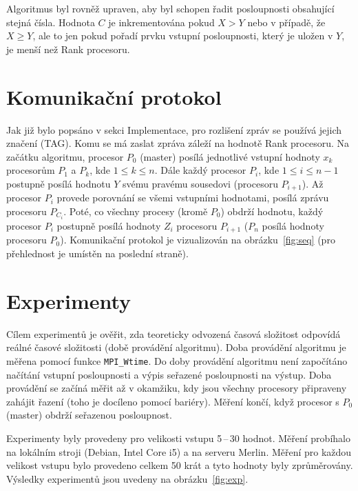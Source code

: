 \documentclass[a4paper,12pt]{article}
\begin{document}
Algoritmus byl rovněž upraven, aby byl schopen řadit posloupnosti obsahující stejná čísla. Hodnota $C$
je inkrementována pokud $X > Y$ nebo v případě, že $X \geq Y$, ale to jen pokud pořadí prvku vstupní 
posloupnosti, který je uložen v $Y$, je menší než Rank procesoru.

\section{Komunikační protokol}
Jak již bylo popsáno v sekci Implementace, pro rozlišení zpráv se používá jejich značení (TAG). Komu se má 
zaslat zpráva záleží na hodnotě Rank procesoru. 
Na začátku algoritmu, procesor $P_0$ (master) posílá jednotlivé 
vstupní hodnoty $x_k$ procesorům $P_1$ a $P_k$, kde $1 \leq k \leq n$. Dále každý procesor $P_i$, kde 
$1 \leq i \leq n-1$ postupně posílá hodnotu $Y$ svému pravému sousedovi (procesoru $P_{i+1}$). Až procesor 
$P_i$ provede porovnání se všemi vstupními hodnotami, posílá zprávu procesoru $P_{C_i}$. Poté, co všechny 
procesy (kromě $P_0$) obdrží hodnotu, každý procesor $P_i$ postupně posílá hodnoty $Z_i$ procesoru $P_{i+1}$ 
($P_n$ posílá hodnoty procesoru $P_0$). Komunikační protokol je vizualizován na obrázku~\ref{fig:seq} (pro 
přehlednost je umístěn na poslední straně).

\section{Experimenty}
Cílem experimentů je ověřit, zda teoreticky odvozená časová složitost odpovídá reálné časové složitosti 
(době provádění algoritmu). Doba provádění algoritmu je měřena pomocí funkce \texttt{MPI\_Wtime}. Do doby 
provádění algoritmu není započítáno načítání vstupní posloupnosti a výpis seřazené posloupnosti na výstup. 
Doba provádění se začíná měřit až v okamžiku, kdy jsou všechny procesory připraveny zahájit řazení (toho 
je docíleno pomocí bariéry). Měření končí, když procesor s $P_0$ (master) obdrží seřazenou posloupnost. 

Experimenty byly provedeny pro velikosti vstupu 5\,--\,30 hodnot. Měření probíhalo na lokálním stroji 
(Debian, Intel Core i5) a na serveru Merlin. Měření pro každou velikost vstupu bylo 
provedeno celkem 50 krát a tyto hodnoty byly zprůměrovány. Výsledky experimentů jsou uvedeny na obrázku~\ref{fig:exp}.
\end{document}
